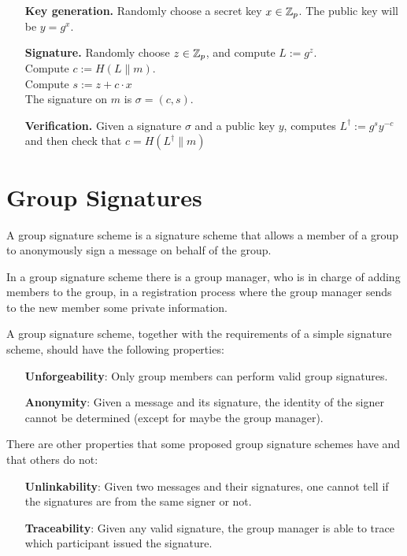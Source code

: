 \begin{itemize}[align = left, leftmargin=*]
	\item[\textbf{Key generation.}]	Randomly choose a secret key $x \in {\mathbb Z}_p$. The public key will be $y = g^x$.
	\item[\textbf{Signature.}] Randomly choose $z \in  {\mathbb Z}_p$, and compute $L := g^z$. \\
Compute $c := H(L \parallel m)$. \\
Compute $s := z + c \cdot x$ \\
The signature on $m$ is $\sigma = (c,s)$.
	\item[\textbf{Verification.}] Given a signature $\sigma$ and a public key $y$, computes $L^{\dagger} := g^{s} y^{-c}$ and then check that $c = H(L^{\dagger} \parallel m) $
\end{itemize}

\section{Group Signatures}
A group signature scheme is a signature scheme that allows a member of a group to anonymously sign a message on behalf of the group.

In a group signature scheme there is a group manager, who is in charge of adding members to the group, in a registration process where the group manager sends to the new member some private information.

A group signature scheme, together with the requirements of a simple signature scheme, should have the following properties:
\begin{itemize}[align = left, leftmargin=*]
\item[\textbf{Unforgeability}:] Only group members can perform valid group signatures.
\item[\textbf{Anonymity}:] Given a message and its signature, the identity of the signer cannot be determined (except for maybe the group manager).
\end{itemize}

There are other properties that some proposed group signature schemes have and that others do not:
\begin{itemize}[align = left, leftmargin=*]
\item[\textbf{Unlinkability}:] Given two messages and their signatures, one cannot tell if the signatures are from the same signer or not.
\item[\textbf{Traceability}:] Given any valid signature, the group manager is able to trace which participant issued the signature.
\end{itemize}

